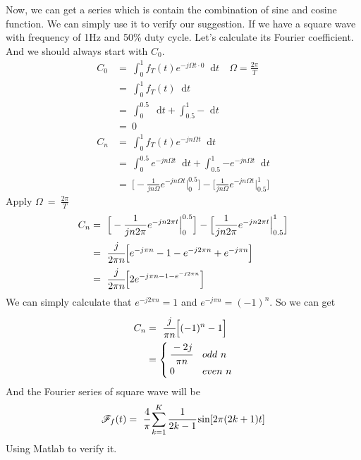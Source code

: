 \documentclass[margin,line]{res}
\newcommand*{\dif}{\mathop{}\!\mathrm{d}}
\begin{document}
\begin{resume}
Now, we can get a series which is contain the combination of sine and cosine function. We can simply use it to verify our suggestion. If we have a square wave with frequency of 1Hz and 50\% duty cycle. Let's calculate its Fourier coefficient. And we should always start with $C_0$.
\begin{align}
C_0 &= \ \int_{0}^{1}{f_T(t) e^{-j\Omega t \cdot 0} \dif t} \quad \Omega=\frac{2\pi}{T} \nonumber \\
	&=\ \int_{0}^{1}{f_T(t) \dif t} \nonumber \\
	&=\ \int_{0}^{0.5}{\dif t} + \int_{0.5}^{1}{- \dif t} \nonumber \\
	&=\ 0 \nonumber \\
C_n &= \ \int_{0}^{1}{ f_T(t) e^{-jn\Omega t} \dif t} \nonumber \\
	&= \ \int_{0}^{0.5}{e^{-jn\Omega t} \dif t} +
		 \int_{0.5}^{1}{-e^{-jn\Omega t} \dif t} \nonumber \\
	&= \ \Big[-\frac{1}{jn\Omega} e^{-jn\Omega t}\Big|_{0}^{0.5} \Big] -
	   	 \Big[\frac{1}{jn\Omega} e^{-jn\Omega t}\Big|_{0.5}^{1} \Big] \nonumber
\end{align}
Apply $\Omega \ = \ \frac{2\pi}{T} $
\begin{align}
C_n	&= \ \Big[-\frac{1}{jn2\pi} e^{-jn2\pi t}\Big|_{0}^{0.5} \Big] -
		 \Big[\frac{1}{jn2\pi} e^{-jn2\pi t}\Big|_{0.5}^{1} \Big] \nonumber \\
	&= \ \cfrac{j}{2\pi n}\Big[ e^{-j\pi n} -1 -e^{-j2\pi n} +e^{-j\pi n} \Big] \nonumber \\
	&= \ \cfrac{j}{2\pi n}\Big[ 2e^{-j\pi n -1 -e^{-j2\pi n}} \Big] \nonumber
\end{align}
We can simply calculate that $e^{-j2\pi n}=1$ and $e^{-j\pi n}=(-1)^{n}$. So we can get
\begin{align}
C_n &= \ \cfrac{j}{\pi n}\Big[ (-1)^n-1 \Big] \nonumber \\
	&=\begin{cases}
		\cfrac{-2j}{\pi n}&  {odd \ n} \\
		0&  {even \ n}
 	  \end{cases}	\nonumber
\end{align}
And the Fourier series of square wave will be
$$
\mathscr{F}_f(t)= \ \cfrac{4}{\pi} \sum\limits_{k=1}^K{\cfrac{1}{2k-1} \sin [2\pi (2k+1)t]}
$$
Using Matlab to verify it.
\begin{figure}[H]
	\centerline{}
\end{figure}
\clearpage


\end{resume}
\end{document}
